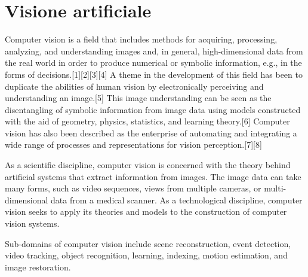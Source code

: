 \chapter{Visione artificiale}

Computer vision is a field that includes methods for acquiring, processing, analyzing, and understanding images and, in general, high-dimensional data from the real world in order to produce numerical or symbolic information, e.g., in the forms of decisions.[1][2][3][4] A theme in the development of this field has been to duplicate the abilities of human vision by electronically perceiving and understanding an image.[5] This image understanding can be seen as the disentangling of symbolic information from image data using models constructed with the aid of geometry, physics, statistics, and learning theory.[6] Computer vision has also been described as the enterprise of automating and integrating a wide range of processes and representations for vision perception.[7][8]

As a scientific discipline, computer vision is concerned with the theory behind artificial systems that extract information from images. The image data can take many forms, such as video sequences, views from multiple cameras, or multi-dimensional data from a medical scanner. As a technological discipline, computer vision seeks to apply its theories and models to the construction of computer vision systems.

Sub-domains of computer vision include scene reconstruction, event detection, video tracking, object recognition, learning, indexing, motion estimation, and image restoration.

\endinput